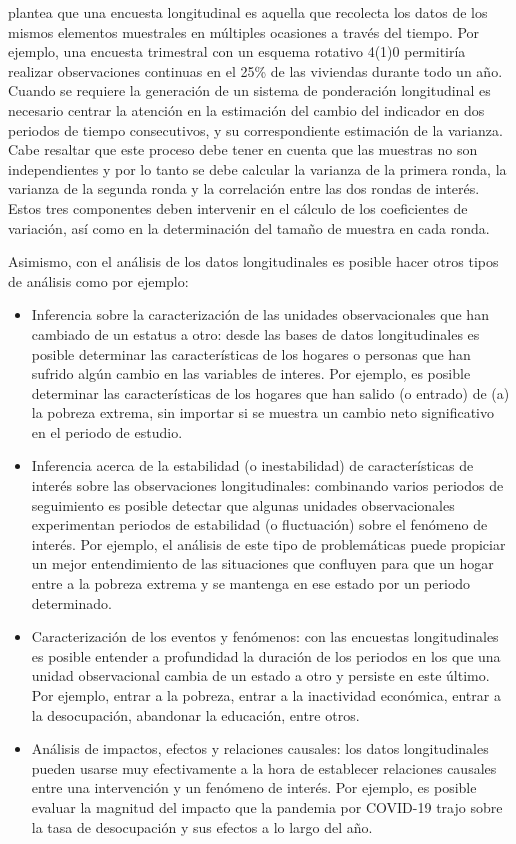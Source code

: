 \documentclass[
  12pt,
  spanish,
]{book}
\providecommand{\tightlist}{%
  \setlength{\itemsep}{0pt}\setlength{\parskip}{0pt}}
\begin{document}
\citet{Lynn_2009} plantea que una encuesta longitudinal es aquella que recolecta los datos de los mismos elementos muestrales en múltiples ocasiones a través del tiempo. Por ejemplo, una encuesta trimestral con un esquema rotativo 4(1)0 permitiría realizar observaciones continuas en el 25\% de las viviendas durante todo un año. Cuando se requiere la generación de un sistema de ponderación longitudinal es necesario centrar la atención en la estimación del cambio del indicador en dos periodos de tiempo consecutivos, y su correspondiente estimación de la varianza. Cabe resaltar que este proceso debe tener en cuenta que las muestras no son independientes y por lo tanto se debe calcular la varianza de la primera ronda, la varianza de la segunda ronda y la correlación entre las dos rondas de interés. Estos tres componentes deben intervenir en el cálculo de los coeficientes de variación, así como en la determinación del tamaño de muestra en cada ronda.

Asimismo, con el análisis de los datos longitudinales es posible hacer otros tipos de análisis como por ejemplo:

\begin{itemize}
\tightlist
\item
  Inferencia sobre la caracterización de las unidades observacionales que han cambiado de un estatus a otro: desde las bases de datos longitudinales es posible determinar las características de los hogares o personas que han sufrido algún cambio en las variables de interes. Por ejemplo, es posible determinar las características de los hogares que han salido (o entrado) de (a) la pobreza extrema, sin importar si se muestra un cambio neto significativo en el periodo de estudio.
\item
  Inferencia acerca de la estabilidad (o inestabilidad) de características de interés sobre las observaciones longitudinales: combinando varios periodos de seguimiento es posible detectar que algunas unidades observacionales experimentan periodos de estabilidad (o fluctuación) sobre el fenómeno de interés. Por ejemplo, el análisis de este tipo de problemáticas puede propiciar un mejor entendimiento de las situaciones que confluyen para que un hogar entre a la pobreza extrema y se mantenga en ese estado por un periodo determinado.
\item
  Caracterización de los eventos y fenómenos: con las encuestas longitudinales es posible entender a profundidad la duración de los periodos en los que una unidad observacional cambia de un estado a otro y persiste en este último. Por ejemplo, entrar a la pobreza, entrar a la inactividad económica, entrar a la desocupación, abandonar la educación, entre otros.
\item
  Análisis de impactos, efectos y relaciones causales: los datos longitudinales pueden usarse muy efectivamente a la hora de establecer relaciones causales entre una intervención y un fenómeno de interés. Por ejemplo, es posible evaluar la magnitud del impacto que la pandemia por COVID-19 trajo sobre la tasa de desocupación y sus efectos a lo largo del año.
\end{itemize}
\end{document}
